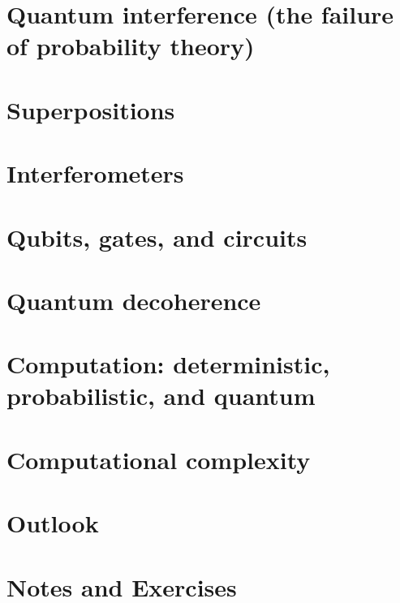 \documentclass[
]{book}
\theoremstyle{definition}
\theoremstyle{definition}
\theoremstyle{definition}
\theoremstyle{remark}
\begin{document}
\hypertarget{quantum-interference-the-failure-of-probability-theory}{%
\section{Quantum interference (the failure of probability theory)}\label{quantum-interference-the-failure-of-probability-theory}}

\hypertarget{superpositions}{%
\section{Superpositions}\label{superpositions}}

\hypertarget{interferometers}{%
\section{Interferometers}\label{interferometers}}

\hypertarget{qubits-gates-and-circuits}{%
\section{Qubits, gates, and circuits}\label{qubits-gates-and-circuits}}

\hypertarget{quantum-decoherence}{%
\section{Quantum decoherence}\label{quantum-decoherence}}

\hypertarget{computation-deterministic-probabilistic-and-quantum}{%
\section{Computation: deterministic, probabilistic, and quantum}\label{computation-deterministic-probabilistic-and-quantum}}

\hypertarget{computational-complexity}{%
\section{Computational complexity}\label{computational-complexity}}

\hypertarget{outlook}{%
\section{Outlook}\label{outlook}}

\hypertarget{notes-and-exercises}{%
\section{Notes and Exercises}\label{notes-and-exercises}}
\end{document}
